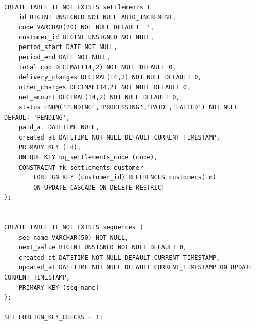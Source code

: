 \documentclass[11pt,a4paper]{article}
\begin{document}
\begin{lstlisting}
CREATE TABLE IF NOT EXISTS settlements (
    id BIGINT UNSIGNED NOT NULL AUTO_INCREMENT,
    code VARCHAR(20) NOT NULL DEFAULT '',
    customer_id BIGINT UNSIGNED NOT NULL,
    period_start DATE NOT NULL,
    period_end DATE NOT NULL,
    total_cod DECIMAL(14,2) NOT NULL DEFAULT 0,
    delivery_charges DECIMAL(14,2) NOT NULL DEFAULT 0,
    other_charges DECIMAL(14,2) NOT NULL DEFAULT 0,
    net_amount DECIMAL(14,2) NOT NULL DEFAULT 0,
    status ENUM('PENDING','PROCESSING','PAID','FAILED') NOT NULL DEFAULT 'PENDING',
    paid_at DATETIME NULL,
    created_at DATETIME NOT NULL DEFAULT CURRENT_TIMESTAMP,
    PRIMARY KEY (id),
    UNIQUE KEY uq_settlements_code (code),
    CONSTRAINT fk_settlements_customer
        FOREIGN KEY (customer_id) REFERENCES customers(id)
        ON UPDATE CASCADE ON DELETE RESTRICT
);


CREATE TABLE IF NOT EXISTS sequences (
    seq_name VARCHAR(50) NOT NULL,
    next_value BIGINT UNSIGNED NOT NULL DEFAULT 0,
    created_at DATETIME NOT NULL DEFAULT CURRENT_TIMESTAMP,
    updated_at DATETIME NOT NULL DEFAULT CURRENT_TIMESTAMP ON UPDATE CURRENT_TIMESTAMP,
    PRIMARY KEY (seq_name)
);

SET FOREIGN_KEY_CHECKS = 1;
\end{lstlisting}
\end{document}
